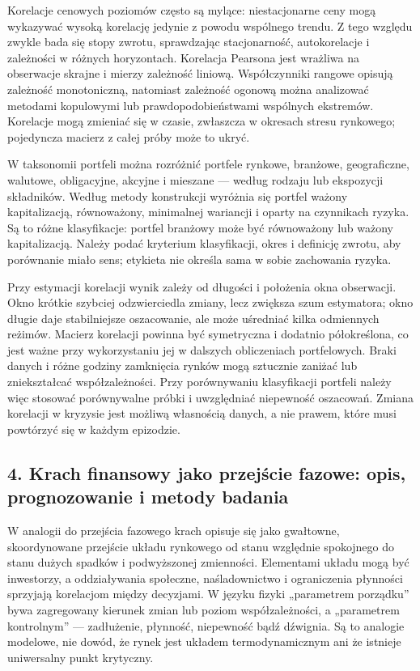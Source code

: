 \documentclass[11pt,a4paper]{article}
\begin{document}
Korelacje cenowych poziomów często są mylące: niestacjonarne ceny mogą wykazywać wysoką korelację jedynie z powodu wspólnego trendu. Z tego względu zwykle bada się stopy zwrotu, sprawdzając stacjonarność, autokorelacje i zależności w różnych horyzontach. Korelacja Pearsona jest wrażliwa na obserwacje skrajne i mierzy zależność liniową. Współczynniki rangowe opisują zależność monotoniczną, natomiast zależność ogonową można analizować metodami kopulowymi lub prawdopodobieństwami wspólnych ekstremów. Korelacje mogą zmieniać się w czasie, zwłaszcza w okresach stresu rynkowego; pojedyncza macierz z całej próby może to ukryć.

W taksonomii portfeli można rozróżnić portfele rynkowe, branżowe, geograficzne, walutowe, obligacyjne, akcyjne i mieszane — według rodzaju lub ekspozycji składników. Według metody konstrukcji wyróżnia się portfel ważony kapitalizacją, równoważony, minimalnej wariancji i oparty na czynnikach ryzyka. Są to różne klasyfikacje: portfel branżowy może być równoważony lub ważony kapitalizacją. Należy podać kryterium klasyfikacji, okres i definicję zwrotu, aby porównanie miało sens; etykieta nie określa sama w sobie zachowania ryzyka.

Przy estymacji korelacji wynik zależy od długości i położenia okna obserwacji. Okno krótkie szybciej odzwierciedla zmiany, lecz zwiększa szum estymatora; okno długie daje stabilniejsze oszacowanie, ale może uśredniać kilka odmiennych reżimów. Macierz korelacji powinna być symetryczna i dodatnio półokreślona, co jest ważne przy wykorzystaniu jej w dalszych obliczeniach portfelowych. Braki danych i różne godziny zamknięcia rynków mogą sztucznie zaniżać lub zniekształcać współzależności. Przy porównywaniu klasyfikacji portfeli należy więc stosować porównywalne próbki i uwzględniać niepewność oszacowań. Zmiana korelacji w kryzysie jest możliwą własnością danych, a nie prawem, które musi powtórzyć się w każdym epizodzie.

\subsection{4. Krach finansowy jako przejście fazowe: opis, prognozowanie i metody badania}

W analogii do przejścia fazowego krach opisuje się jako gwałtowne, skoordynowane przejście układu rynkowego od stanu względnie spokojnego do stanu dużych spadków i podwyższonej zmienności. Elementami układu mogą być inwestorzy, a oddziaływania społeczne, naśladownictwo i ograniczenia płynności sprzyjają korelacjom między decyzjami. W języku fizyki „parametrem porządku” bywa zagregowany kierunek zmian lub poziom współzależności, a „parametrem kontrolnym” — zadłużenie, płynność, niepewność bądź dźwignia. Są to analogie modelowe, nie dowód, że rynek jest układem termodynamicznym ani że istnieje uniwersalny punkt krytyczny.
\end{document}
